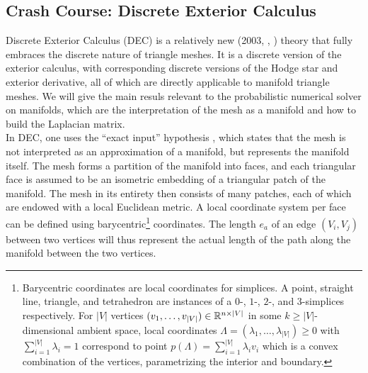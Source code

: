 \subsection*{Crash Course: Discrete Exterior Calculus}
Discrete Exterior Calculus (DEC) is a relatively new (2003, \cite{discrete_exterior_calculus_thesis}, \cite{discrete_exterior_calculus}) theory that fully embraces the discrete nature of triangle meshes. It is a discrete version of the exterior calculus, with corresponding discrete versions of the Hodge star and exterior derivative, all of which are directly applicable to manifold triangle meshes. We will give the main resuls relevant to the probabilistic numerical solver on manifolds, which are the interpretation of the mesh as a manifold and how to build the Laplacian matrix. 
\\
In DEC, one uses the “exact input” hypothesis \cite{sharp2021intrinsic}, which states that the mesh is not interpreted as an approximation of a manifold, but represents the manifold itself. The mesh forms a partition of the manifold into faces, and each triangular face is assumed to be an isometric embedding of a triangular patch of the manifold. The mesh in its entirety then consists of many patches, each of which are endowed with a local Euclidean metric. A local coordinate system per face can be defined using barycentric\footnote{Barycentric coordinates are local coordinates for simplices. A point, straight line, triangle, and tetrahedron are instances of a $0$-, $1$-, $2$-, and $3$-simplices respectively. For $|V|$ vertices $(v_1, \dots, v_{|V|})\in \mathbb{R}^{n \times |V|}$ in some $k \geq |V|$-dimensional ambient space, local coordinates $\Lambda = (\lambda_1, \dots, \lambda_{|V|}) \geq 0$ with $\sum_{i=1}^{|V|} \lambda_i = 1$ correspond to point $p(\Lambda) = \sum_{i=1}^{|V|} \lambda_i v_i$ which is a convex combination of the vertices, parametrizing the interior and boundary.} coordinates. The length $e_a$ of an edge $(V_i, V_j)$ between two vertices will thus represent the actual length of the path along the manifold between the two vertices.

